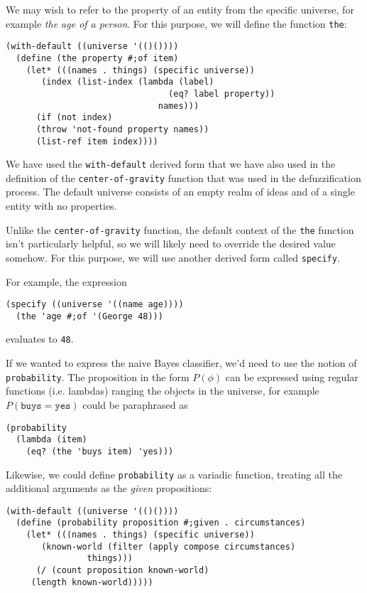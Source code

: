 We may wish to refer to the property of an entity
from the specific universe, for example \textit{the age
of a person}. For this purpose, we will define the
function \texttt{the}:

\begin{Verbatim}[samepage=true]
(with-default ((universe '(()())))
  (define (the property #;of item)
    (let* (((names . things) (specific universe))
	   (index (list-index (lambda (label) 
                                (eq? label property)) 
                              names)))
      (if (not index)
	  (throw 'not-found property names))
      (list-ref item index))))
\end{Verbatim}

We have used the \texttt{with-default} derived form
that we have also used in the definition of the
\texttt{center\--of\--gravity} function that was used
in the defuzzification process. The default universe
consists of an empty realm of ideas and of a single
entity with no properties.

Unlike the \texttt{center\--of\--gravity} function,
the default context of the \texttt{the} function isn't
particularly helpful, so we will likely need to
override the desired value somehow. For this purpose,
we will use another derived form called \texttt{specify}.

For example, the expression
\begin{Verbatim}[samepage=true]
(specify ((universe '((name age))))
  (the 'age #;of '(George 48)))
\end{Verbatim}
evaluates to \texttt{48}.

If we wanted to express the naive Bayes classifier,
we'd need to use the notion of \texttt{probability}.
The proposition in the form $P(\phi)$ can be expressed
using regular functions (i.e. lambdas) ranging the
objects in the universe, for example
$P(\mathtt{buys}=\mathtt{yes})$ could be paraphrased as
\begin{Verbatim}[samepage=true]
(probability 
  (lambda (item) 
    (eq? (the 'buys item) 'yes)))
\end{Verbatim}

Likewise, we could define \texttt{probability} as
a variadic function, treating all the additional
arguments as the \textit{given} propositions:

\begin{Verbatim}[samepage=true]
(with-default ((universe '(()())))
  (define (probability proposition #;given . circumstances)
    (let* (((names . things) (specific universe))
	   (known-world (filter (apply compose circumstances) 
				things)))
      (/ (count proposition known-world)
	 (length known-world)))))
\end{Verbatim}

